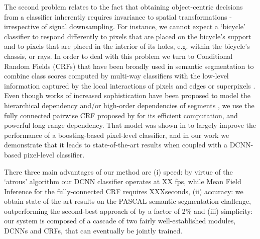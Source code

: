 The second problem relates to the fact that obtaining object-centric decisions from a classifier inherently requires invariance to spatial transformations - irrespective of signal downsampling. For instance, we cannot expect a `bicycle' classifier to respond differently to pixels that are  placed on the bicycle's support and to pixels that are placed in the interior of its holes, e.g. within the bicycle's chassis, or rays. In order to deal with this problem we turn to  Conditional Random Fields (CRFs) that have been broadly used in semantic segmentation to combine class scores computed by multi-way classifiers with the low-level information captured by the local interactions of pixels and edges\citep{rother2004grabcut, shotton2009textonboost} or superpixels \citep{lucchi2011spatial}. Even though works of increased sophistication have been proposed 
 to model the hierarchical dependency \citep{he2004multiscale, ladicky2009associative, lempitsky2011pylon} and/or  high-order dependencies of segments \citep{delong2012fast, gonfaus2010harmony, kohli2009robust, krahenbuhl2011efficient}, we use the  fully connected pairwise CRF proposed by \citet{krahenbuhl2011efficient} for its efficient computation, and powerful long range dependency. That model was shown in  \citet{krahenbuhl2011efficient} to largely improve the performance of a boosting-based pixel-level classifier, and in our work we demonstrate that it leads to state-of-the-art results when coupled with a DCNN-based pixel-level classifier. 


There  three main advantages of our method are (i) speed: by virtue of the `atrous' algorithm our DCNN classifier operates at XX fps, while Mean Field Inference for the fully-connected CRF requires XXXseconds, (ii) accuracy: we obtain state-of-the-art results on the PASCAL semantic segmentation challenge, outperforming the second-best approach of \citet{mostajabi2014feedforward} by a factor of 2$\%$ and (iii) simplicity: our system is composed of a cascade of two fairly well-established modules, DCNNs and CRFs, that can eventually be jointly trained. 


